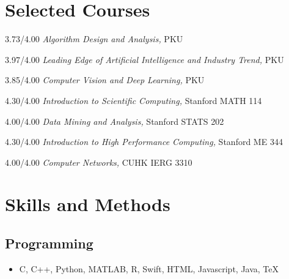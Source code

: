 \documentclass{academiccv}
\begin{document}
\newpage

\section*{Selected Courses}

\begin{tablist}

\item[3.73/4.00] \tab \emph{Algorithm Design and Analysis}\emph, PKU
\item[3.97/4.00] \tab  \emph{Leading Edge of Artificial Intelligence and Industry Trend}\emph, PKU
\item[3.85/4.00] \tab \emph{Computer Vision and Deep Learning}\emph, PKU
\item[4.30/4.00] \tab \emph{Introduction to Scientific Computing}\emph, Stanford MATH 114

\item[4.00/4.00] \tab \emph{Data Mining and Analysis}\emph, Stanford STATS 202

\item[4.30/4.00] \tab \emph{Introduction to High Performance Computing}\emph, Stanford ME 344

\item[4.00/4.00] \tab \emph{Computer Networks}\emph, CUHK IERG 3310

\end{tablist}

\section*{Skills and Methods}

\subsection*{Programming}
\begin{itemize}
	\item C, C++, Python, MATLAB, R, Swift, HTML, Javascript, Java, \TeX{}
\end{itemize}
\end{document}
